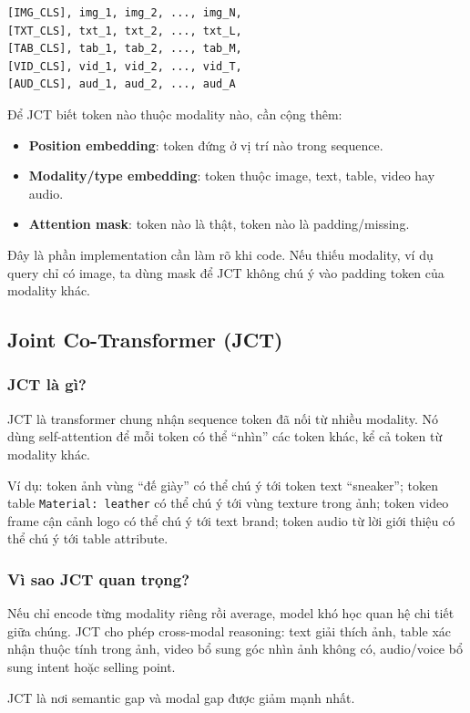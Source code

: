 \documentclass[12pt,a4paper]{article}
\begin{document}
\begin{lstlisting}
[IMG_CLS], img_1, img_2, ..., img_N,
[TXT_CLS], txt_1, txt_2, ..., txt_L,
[TAB_CLS], tab_1, tab_2, ..., tab_M,
[VID_CLS], vid_1, vid_2, ..., vid_T,
[AUD_CLS], aud_1, aud_2, ..., aud_A
\end{lstlisting}

Để JCT biết token nào thuộc modality nào, cần cộng thêm:
\begin{itemize}
  \item \textbf{Position embedding}: token đứng ở vị trí nào trong sequence.
  \item \textbf{Modality/type embedding}: token thuộc image, text, table, video hay audio.
  \item \textbf{Attention mask}: token nào là thật, token nào là padding/missing.
\end{itemize}

Đây là phần implementation cần làm rõ khi code. Nếu thiếu modality, ví dụ query chỉ có image, ta dùng mask để JCT không chú ý vào padding token của modality khác.

\subsection{Joint Co-Transformer (JCT)}

\subsubsection{JCT là gì?}
JCT là transformer chung nhận sequence token đã nối từ nhiều modality. Nó dùng self-attention để mỗi token có thể ``nhìn'' các token khác, kể cả token từ modality khác.

Ví dụ: token ảnh vùng ``đế giày'' có thể chú ý tới token text ``sneaker''; token table \texttt{Material: leather} có thể chú ý tới vùng texture trong ảnh; token video frame cận cảnh logo có thể chú ý tới text brand; token audio từ lời giới thiệu có thể chú ý tới table attribute.

\subsubsection{Vì sao JCT quan trọng?}
Nếu chỉ encode từng modality riêng rồi average, model khó học quan hệ chi tiết giữa chúng. JCT cho phép cross-modal reasoning: text giải thích ảnh, table xác nhận thuộc tính trong ảnh, video bổ sung góc nhìn ảnh không có, audio/voice bổ sung intent hoặc selling point.

JCT là nơi semantic gap và modal gap được giảm mạnh nhất.
\end{document}
